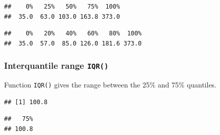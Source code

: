 \documentclass[]{book}
\newenvironment{Shaded}{\begin{snugshade}}{\end{snugshade}}
\newcommand{\CommentTok}[1]{\textcolor[rgb]{0.56,0.35,0.01}{\textit{#1}}}
\newcommand{\DataTypeTok}[1]{\textcolor[rgb]{0.13,0.29,0.53}{#1}}
\newcommand{\DecValTok}[1]{\textcolor[rgb]{0.00,0.00,0.81}{#1}}
\newcommand{\FloatTok}[1]{\textcolor[rgb]{0.00,0.00,0.81}{#1}}
\newcommand{\KeywordTok}[1]{\textcolor[rgb]{0.13,0.29,0.53}{\textbf{#1}}}
\newcommand{\NormalTok}[1]{#1}
\newcommand{\OperatorTok}[1]{\textcolor[rgb]{0.81,0.36,0.00}{\textbf{#1}}}
\newcommand{\StringTok}[1]{\textcolor[rgb]{0.31,0.60,0.02}{#1}}
\begin{document}
\begin{verbatim}
##    0%   25%   50%   75%  100% 
##  35.0  63.0 103.0 163.8 373.0
\end{verbatim}

\begin{Shaded}
\end{Shaded}

\begin{verbatim}
##    0%   20%   40%   60%   80%  100% 
##  35.0  57.0  85.0 126.0 181.6 373.0
\end{verbatim}

\hypertarget{interquantile-range-iqr}{%
\subsubsection*{\texorpdfstring{Interquantile range \texttt{IQR()}}{Interquantile range IQR()}}\label{interquantile-range-iqr}}

Function \texttt{IQR()} gives the range between the 25\% and 75\% quantiles.

\begin{Shaded}
\end{Shaded}

\begin{verbatim}
## [1] 100.8
\end{verbatim}

\begin{Shaded}
\end{Shaded}

\begin{verbatim}
##   75% 
## 100.8
\end{verbatim}
\end{document}
